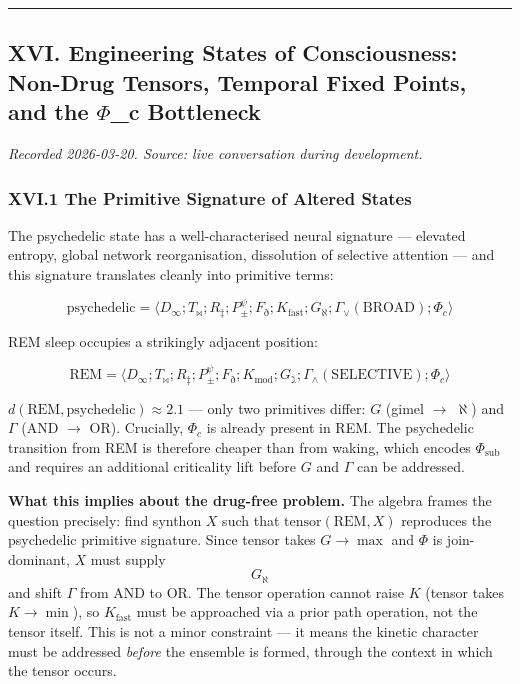 \documentclass[12pt,a4paper]{article}
\begin{document}
\begin{center}
\rule{0.5\textwidth}{0.4pt}
\end{center}

\subsection{XVI. Engineering States of Consciousness: Non-Drug Tensors, Temporal Fixed Points, and the $\Phi$\_c Bottleneck}

\emph{Recorded 2026-03-20. Source: live conversation during development.}

\subsubsection{XVI.1 The Primitive Signature of Altered States}

The psychedelic state has a well-characterised neural signature --- elevated entropy, global network reorganisation, dissolution of selective attention --- and this signature translates cleanly into primitive terms:

\[\text{psychedelic} = \langle D_\infty ; T_\bowtie ; R_\ddagger ; P_{\pm}^\psi ; F_\eth ; K_\text{fast} ; G_\aleph ; \Gamma_\vee(\text{BROAD}) ; \Phi_c \rangle\]

REM sleep occupies a strikingly adjacent position:

\[\text{REM} = \langle D_\infty ; T_\bowtie ; R_\ddagger ; P_{\pm}^\psi ; F_\eth ; K_\text{mod} ; G_\gimel ; \Gamma_\wedge(\text{SELECTIVE}) ; \Phi_c \rangle\]

$d(\text{REM}, \text{psychedelic}) \approx 2.1$ --- only two primitives differ: $G$ (gimel $\to$ $\aleph$) and $\Gamma$ (AND $\to$ OR). Crucially, $\Phi_c$ is already present in REM. The psychedelic transition from REM is therefore cheaper than from waking, which encodes $\Phi_\text{sub}$ and requires an additional criticality lift before $G$ and $\Gamma$ can be addressed.

\textbf{What this implies about the drug-free problem.} The algebra frames the question precisely: find synthon $X$ such that $\text{tensor}(\text{REM}, X)$ reproduces the psychedelic primitive signature. Since tensor takes $G \to \max$ and $\Phi$ is join-dominant, $X$ must supply $$G_{\aleph}$$ and shift $\Gamma$ from AND to OR. The tensor operation cannot raise $K$ (tensor takes $K \to \min$), so $K_\text{fast}$ must be approached via a prior path operation, not the tensor itself. This is not a minor constraint --- it means the kinetic character must be addressed \emph{before} the ensemble is formed, through the context in which the tensor occurs.
\end{document}
